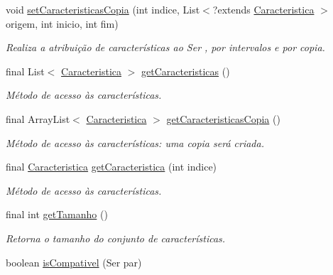 \begin{DoxyCompactItemize}
void \hyperlink{classic_1_1populacional_1_1_ser_3_01_n_01extends_01_number_01_4_a04dff0f71cc07aa0e4f0435cb5ed68e5}{set\-Caracteristicas\-Copia} (int indice, List$<$?extends \hyperlink{classic_1_1populacional_1_1_caracteristica}{Caracteristica} $>$ origem, int inicio, int fim)
\begin{DoxyCompactList}\small\item\em Realiza a atribuição de {\ttfamily características} ao {\ttfamily Ser} , por intervalos e por copia. \end{DoxyCompactList}\item 
final List$<$ \hyperlink{classic_1_1populacional_1_1_caracteristica}{Caracteristica} $>$ \hyperlink{classic_1_1populacional_1_1_ser_3_01_n_01extends_01_number_01_4_a28a559dba9e716c3018b0f35bf6e3155}{get\-Caracteristicas} ()
\begin{DoxyCompactList}\small\item\em Método de acesso às características. \end{DoxyCompactList}\item 
final Array\-List$<$ \hyperlink{classic_1_1populacional_1_1_caracteristica}{Caracteristica} $>$ \hyperlink{classic_1_1populacional_1_1_ser_3_01_n_01extends_01_number_01_4_a0077b305a7b6b7fd4729a6c14a9bcd84}{get\-Caracteristicas\-Copia} ()
\begin{DoxyCompactList}\small\item\em Método de acesso às características\-: uma copia será criada. \end{DoxyCompactList}\item 
final \hyperlink{classic_1_1populacional_1_1_caracteristica}{Caracteristica} \hyperlink{classic_1_1populacional_1_1_ser_3_01_n_01extends_01_number_01_4_afaea0d3c10458f11bca83e8bf6db9b17}{get\-Caracteristica} (int indice)
\begin{DoxyCompactList}\small\item\em Método de acesso às características. \end{DoxyCompactList}\item 
final int \hyperlink{classic_1_1populacional_1_1_ser_3_01_n_01extends_01_number_01_4_ac4f427d51fb6cb1ffb8d399c53d4b0c7}{get\-Tamanho} ()
\begin{DoxyCompactList}\small\item\em Retorna o tamanho do conjunto de características. \end{DoxyCompactList}\item 
boolean \hyperlink{classic_1_1populacional_1_1_ser_3_01_n_01extends_01_number_01_4_a046dacd1adf6ef31d4040b906434c6f6}{is\-Compativel} (Ser par)

\end{DoxyCompactItemize}

